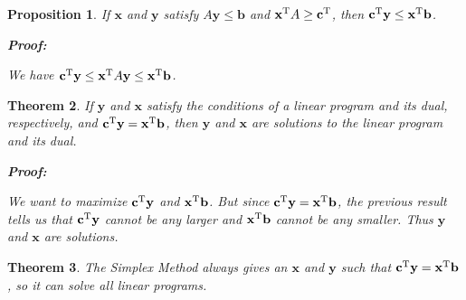 \documentclass{article}
\theoremstyle{colontheorem}
\newtheorem{theorem}{Theorem}[section]
\newtheorem{proposition}[theorem]{Proposition}
\newcommand{\T}{^\textnormal{T}}
\newenvironment{Theorem}
{
	\begin{mdframed}[backgroundcolor=TheoremOrange!10]
	\begin{theorem}
}
{
	\end{theorem}
	\end{mdframed}
	
	\vspace{.15in}
}
\newenvironment{Proposition}
{
	\begin{mdframed}[backgroundcolor=PropPink!10]
	\begin{proposition}
}
{
	\end{proposition}
	\end{mdframed}
	
	\vspace{.15in}
}
\newenvironment{Proof}
{
	\begin{mdframed}[backgroundcolor=ProofPurple!10]
	\textbf{Proof:}%
}
{
	\end{mdframed}
	
	\vspace{.085in}
}
\begin{document}
\begin{Proposition}
	
	If $\mathbf{x}$ and $\mathbf{y}$ satisfy $A\mathbf{y} \leq \mathbf{b}$ and $\mathbf{x}\T A \geq \mathbf{c}\T$, then $\mathbf{c}\T \mathbf{y} \leq \mathbf{x}\T \mathbf{b}$.
	
	\begin{Proof}
		We have $\mathbf{c}\T \mathbf{y} \leq \mathbf{x}\T A \mathbf{y} \leq \mathbf{x}\T \mathbf{b}$.
		
	\end{Proof}
	
\end{Proposition}



\begin{Theorem}
	
	If $\mathbf{y}$ and $\mathbf{x}$ satisfy the conditions of a linear program and its dual, respectively, and $\mathbf{c}\T \mathbf{y} = \mathbf{x}\T \mathbf{b}$, then $\mathbf{y}$ and $\mathbf{x}$ are solutions to the linear program and its dual.
	
	\begin{Proof}
		We want to maximize $\mathbf{c}\T \mathbf{y}$ and $\mathbf{x}\T \mathbf{b}$. But since $\mathbf{c}\T \mathbf{y} = \mathbf{x}\T \textbf{b}$, the previous result tells us that $\mathbf{c}\T \mathbf{y}$ cannot be any larger and $\mathbf{x}\T \mathbf{b}$ cannot be any smaller. Thus $\mathbf{y}$ and $\mathbf{x}$ are solutions.
		
	\end{Proof}
	
\end{Theorem}



\begin{Theorem}
	
	The Simplex Method always gives an $\mathbf{x}$ and $\mathbf{y}$ such that $\mathbf{c}\T \mathbf{y} = \mathbf{x}\T \textbf{b}$, so it can solve all linear programs.
	
\end{Theorem}
\end{document}
